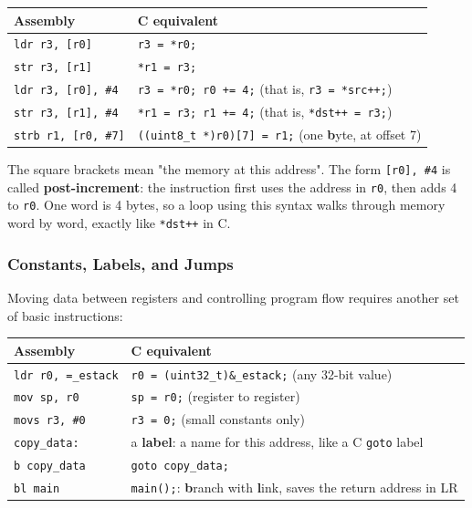 \begin{table}[h!]
\centering
\begin{tabular}{|l|l|}
\hline
\textbf{Assembly} & \textbf{C equivalent} \\ \hline
\texttt{ldr r3, [r0]} & \texttt{r3 = *r0;} \\ \hline
\texttt{str r3, [r1]} & \texttt{*r1 = r3;} \\ \hline
\texttt{ldr r3, [r0], \#4} & \texttt{r3 = *r0; r0 += 4;} (that is, \texttt{r3 = *src++;}) \\ \hline
\texttt{str r3, [r1], \#4} & \texttt{*r1 = r3; r1 += 4;} (that is, \texttt{*dst++ = r3;}) \\ \hline
\texttt{strb r1, [r0, \#7]} & \texttt{((uint8\_t *)r0)[7] = r1;} (one \textbf{b}yte, at offset 7) \\ \hline
\end{tabular}
\end{table}

The square brackets mean "the memory at this address". The form \texttt{[r0], \#4} is called \textbf{post-increment}: the instruction first uses the address in \texttt{r0}, then adds 4 to \texttt{r0}. One word is 4 bytes, so a loop using this syntax walks through memory word by word, exactly like \texttt{*dst++} in C.

\subsubsection{Constants, Labels, and Jumps}
Moving data between registers and controlling program flow requires another set of basic instructions:

\begin{table}[h!]
    \centering
    \begin{tabular}{|l|l|}
        \hline
        \textbf{Assembly} & \textbf{C equivalent} \\ \hline
        \texttt{ldr r0, =\_estack} & \texttt{r0 = (uint32\_t)\&\_estack;} (any 32-bit value) \\ \hline
        \texttt{mov sp, r0} & \texttt{sp = r0;} (register to register) \\ \hline
        \texttt{movs r3, \#0} & \texttt{r3 = 0;} (small constants only) \\ \hline
        \texttt{copy\_data:} & a \textbf{label}: a name for this address, like a C \texttt{goto} label \\ \hline
        \texttt{b copy\_data} & \texttt{goto copy\_data;} \\ \hline
        \texttt{bl main} & \texttt{main();}: \textbf{b}ranch with \textbf{l}ink, saves the return address in LR \\ \hline
    \end{tabular}
\end{table}


